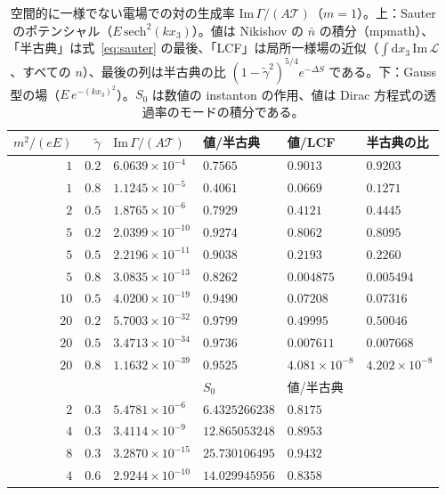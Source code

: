 \documentclass[a4paper,10pt]{ltjsarticle}
\newcommand{\dd}{\mathrm{d}}
\begin{document}
\begin{table}[tbp]
\centering\small
\caption{空間的に一様でない電場での対の生成率 $\mathrm{Im}\,\Gamma/(A\mathcal T)$（$m=1$）。上：Sauter のポテンシャル（$E\,\mathrm{sech}^2(kx_3)$）。値は Nikishov の $\bar n$ の積分（mpmath）、「半古典」は式~\eqref{eq:sauter} の最後、「LCF」は局所一様場の近似（$\int\dd x_3\,\mathrm{Im}\,\mathcal L$、すべての $n$）、最後の列は半古典の比 $(1-\tilde\gamma^2)^{5/4}e^{-\Delta S}$ である。下：Gauss 型の場（$E\,e^{-(kx_3)^2}$）。$S_0$ は数値の instanton の作用、値は Dirac 方程式の透過率のモードの積分である。}
\label{tab:sauter}
\footnotesize\setlength{\tabcolsep}{5pt}
\begin{tabular}{rrllll}
\toprule
$m^2/(eE)$ & $\tilde\gamma$ & $\mathrm{Im}\,\Gamma/(A\mathcal T)$ & 値/半古典 & 値/LCF & 半古典の比 \\
\midrule
$1$ & $0.2$ & $6.0639\times10^{-4}$ & $0.7565$ & $0.9013$ & $0.9203$ \\
$1$ & $0.8$ & $1.1245\times10^{-5}$ & $0.4061$ & $0.0669$ & $0.1271$ \\
$2$ & $0.5$ & $1.8765\times10^{-6}$ & $0.7929$ & $0.4121$ & $0.4445$ \\
$5$ & $0.2$ & $2.0399\times10^{-10}$ & $0.9274$ & $0.8062$ & $0.8095$ \\
$5$ & $0.5$ & $2.2196\times10^{-11}$ & $0.9038$ & $0.2193$ & $0.2260$ \\
$5$ & $0.8$ & $3.0835\times10^{-13}$ & $0.8262$ & $0.004875$ & $0.005494$ \\
$10$ & $0.5$ & $4.0200\times10^{-19}$ & $0.9490$ & $0.07208$ & $0.07316$ \\
$20$ & $0.2$ & $5.7003\times10^{-32}$ & $0.9799$ & $0.49995$ & $0.50046$ \\
$20$ & $0.5$ & $3.4713\times10^{-34}$ & $0.9736$ & $0.007611$ & $0.007668$ \\
$20$ & $0.8$ & $1.1632\times10^{-39}$ & $0.9525$ & $4.081\times10^{-8}$ & $4.202\times10^{-8}$ \\
\midrule
 & & & $S_0$ & 値/半古典 & \\
$2$ & $0.3$ & $5.4781\times10^{-6}$ & $6.4325266238$ & $0.8175$ & \\
$4$ & $0.3$ & $3.4114\times10^{-9}$ & $12.865053248$ & $0.8953$ & \\
$8$ & $0.3$ & $3.2870\times10^{-15}$ & $25.730106495$ & $0.9432$ & \\
$4$ & $0.6$ & $2.9244\times10^{-10}$ & $14.029945956$ & $0.8358$ & \\
\bottomrule
\end{tabular}
\end{table}
\end{document}
